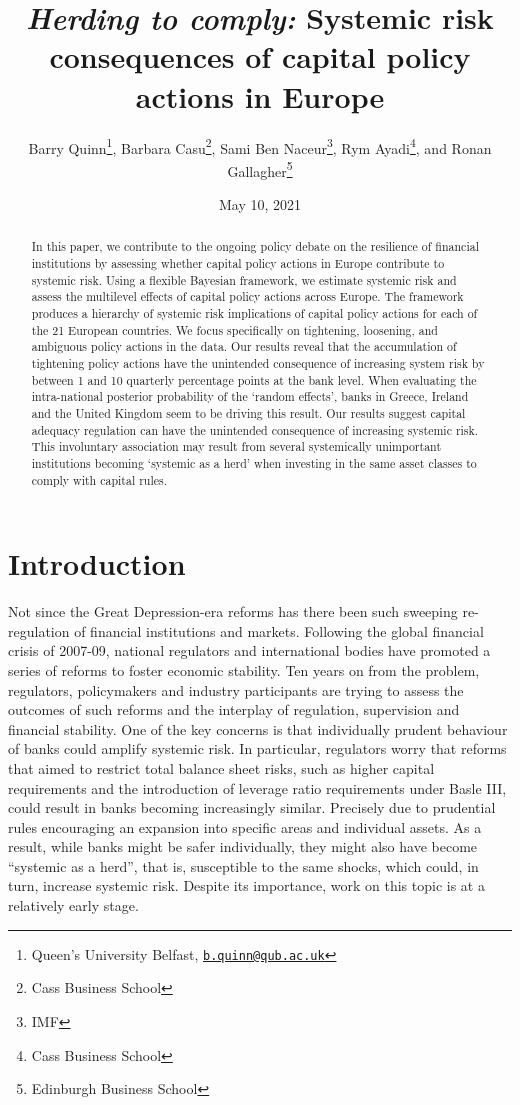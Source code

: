 \documentclass[
  10pt,
]{article}
\title{\emph{Herding to comply:} Systemic risk consequences of capital policy
actions in Europe}
\author{Barry Quinn\footnote{Queen's University Belfast,
  \href{mailto:b.quinn@qub.ac.uk}{\nolinkurl{b.quinn@qub.ac.uk}}},
Barbara Casu\footnote{Cass Business School}, Sami Ben Naceur\footnote{IMF},
Rym Ayadi\footnote{Cass Business School}, and Ronan Gallagher\footnote{Edinburgh
  Business School}}
\date{May 10, 2021}
\begin{document}
\maketitle
\begin{abstract}
In this paper, we contribute to the ongoing policy debate on the
resilience of financial institutions by assessing whether capital policy
actions in Europe contribute to systemic risk. Using a flexible Bayesian
framework, we estimate systemic risk and assess the multilevel effects
of capital policy actions across Europe. The framework produces a
hierarchy of systemic risk implications of capital policy actions for
each of the 21 European countries. We focus specifically on tightening,
loosening, and ambiguous policy actions in the data. Our results reveal
that the accumulation of tightening policy actions have the unintended
consequence of increasing system risk by between 1 and 10 quarterly
percentage points at the bank level. When evaluating the intra-national
posterior probability of the `random effects', banks in Greece, Ireland
and the United Kingdom seem to be driving this result. Our results
suggest capital adequacy regulation can have the unintended consequence
of increasing systemic risk. This involuntary association may result
from several systemically unimportant institutions becoming `systemic as
a herd' when investing in the same asset classes to comply with capital
rules.
\end{abstract}

\hypertarget{introduction}{%
\section{Introduction}\label{introduction}}

Not since the Great Depression-era reforms has there been such sweeping
re-regulation of financial institutions and markets. Following the
global financial crisis of 2007-09, national regulators and
international bodies have promoted a series of reforms to foster
economic stability. Ten years on from the problem, regulators,
policymakers and industry participants are trying to assess the outcomes
of such reforms and the interplay of regulation, supervision and
financial stability. One of the key concerns is that individually
prudent behaviour of banks could amplify systemic risk. In particular,
regulators worry that reforms that aimed to restrict total balance sheet
risks, such as higher capital requirements and the introduction of
leverage ratio requirements under Basle III, could result in banks
becoming increasingly similar. Precisely due to prudential rules
encouraging an expansion into specific areas and individual assets. As a
result, while banks might be safer individually, they might also have
become ``systemic as a herd'', that is, susceptible to the same shocks,
which could, in turn, increase systemic risk. Despite its importance,
work on this topic is at a relatively early stage.
\end{document}
